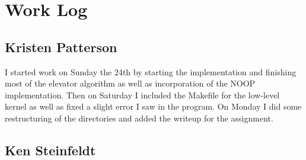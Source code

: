 \documentclass[10pt,letterpaper,onecolumn,draftclsnofoot]{IEEEtran}
\begin{document}
\section{Work Log}
\subsection{Kristen Patterson}
I started work on Sunday the 24th by starting the implementation and finishing most of the elevator algorithm as well as incorporation of the NOOP implementation. Then on Saturday I included the Makefile for the low-level kernel as well as fixed a slight error I saw in the program. On Monday I did some restructuring of the directories and added the writeup for the assignment.

\subsection{Ken Steinfeldt}
\end{document}
